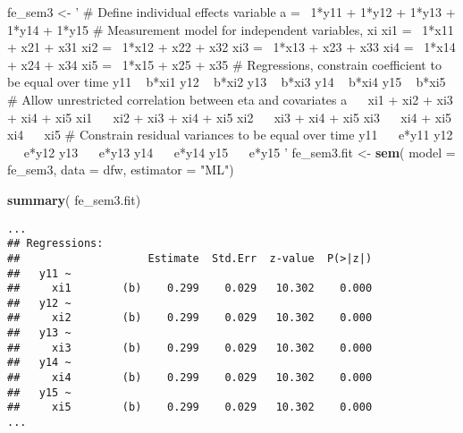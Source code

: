\documentclass[]{interact}
\theoremstyle{plain}%
\theoremstyle{definition}
\theoremstyle{remark}
\newenvironment{Shaded}{\begin{snugshade}}{\end{snugshade}}
\newcommand{\DataTypeTok}[1]{\textcolor[rgb]{0.13,0.29,0.53}{#1}}
\newcommand{\KeywordTok}[1]{\textcolor[rgb]{0.13,0.29,0.53}{\textbf{#1}}}
\newcommand{\NormalTok}[1]{#1}
\newcommand{\StringTok}[1]{\textcolor[rgb]{0.31,0.60,0.02}{#1}}
\begin{document}
\singlespacing

\begin{Shaded}
\begin{Highlighting}[]
\NormalTok{fe_sem3 <-}\StringTok{ '}
\StringTok{# Define individual effects variable }
\StringTok{a =~ 1*y11 + 1*y12 + 1*y13 + 1*y14 + 1*y15}
\StringTok{# Measurement model for independent variables, xi }
\StringTok{xi1 =~ 1*x11 + x21 + x31 }
\StringTok{xi2 =~ 1*x12 + x22 + x32}
\StringTok{xi3 =~ 1*x13 + x23 + x33}
\StringTok{xi4 =~ 1*x14 + x24 + x34}
\StringTok{xi5 =~ 1*x15 + x25 + x35}
\StringTok{# Regressions, constrain coefficient to be equal over time}
\StringTok{y11 ~ b*xi1}
\StringTok{y12 ~ b*xi2 }
\StringTok{y13 ~ b*xi3}
\StringTok{y14 ~ b*xi4}
\StringTok{y15 ~ b*xi5}
\StringTok{# Allow unrestricted correlation between eta and covariates}
\StringTok{a ~~ xi1 + xi2 + xi3 + xi4 + xi5}
\StringTok{xi1 ~~ xi2 + xi3 + xi4 + xi5}
\StringTok{xi2 ~~ xi3 + xi4 + xi5}
\StringTok{xi3 ~~ xi4 + xi5}
\StringTok{xi4 ~~ xi5}
\StringTok{# Constrain residual variances to be equal over time}
\StringTok{y11 ~~ e*y11}
\StringTok{y12 ~~ e*y12}
\StringTok{y13 ~~ e*y13}
\StringTok{y14 ~~ e*y14}
\StringTok{y15 ~~ e*y15}
\StringTok{'}
\NormalTok{fe_sem3.fit <-}\StringTok{ }\KeywordTok{sem}\NormalTok{( }\DataTypeTok{model =}\NormalTok{ fe_sem3, }
                    \DataTypeTok{data =}\NormalTok{ dfw, }
                    \DataTypeTok{estimator =} \StringTok{"ML"}\NormalTok{)}
\end{Highlighting}
\end{Shaded}

\doublespacing

\singlespacing

\begin{Shaded}
\begin{Highlighting}[]
\KeywordTok{summary}\NormalTok{( fe_sem3.fit)}
\end{Highlighting}
\end{Shaded}

\begin{verbatim}
...
## Regressions:
##                    Estimate  Std.Err  z-value  P(>|z|)
##   y11 ~                                               
##     xi1        (b)    0.299    0.029   10.302    0.000
##   y12 ~                                               
##     xi2        (b)    0.299    0.029   10.302    0.000
##   y13 ~                                               
##     xi3        (b)    0.299    0.029   10.302    0.000
##   y14 ~                                               
##     xi4        (b)    0.299    0.029   10.302    0.000
##   y15 ~                                               
##     xi5        (b)    0.299    0.029   10.302    0.000
...
\end{verbatim}
\end{document}
